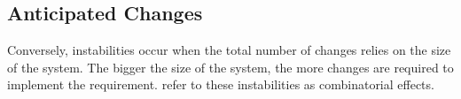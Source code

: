 \subsection{Anticipated Changes} \label{subsec_anticipated_changes}

Conversely, instabilities occur when the total number of changes relies
on the size of the system. The bigger the size of the system, the more changes are
required to implement the requirement.\textcite[271]{mannaert_normalized_2016} refer to
these instabilities as combinatorial effects.